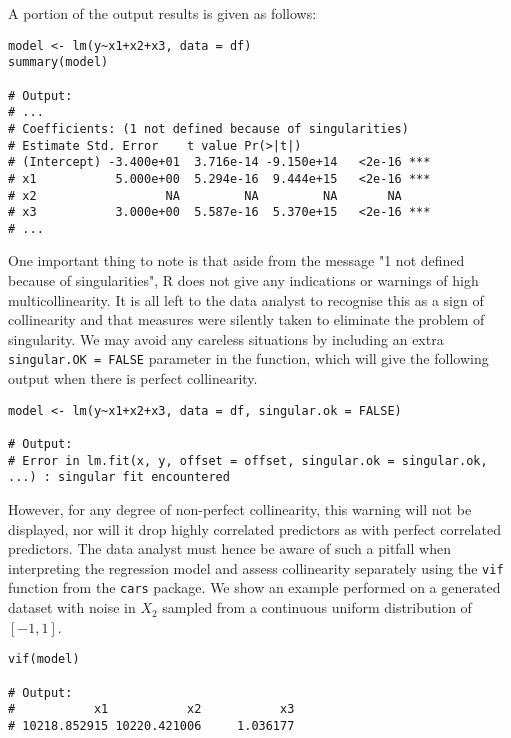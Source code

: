 \documentclass[12pt]{article}
\begin{document}
	A portion of the output results is given as follows:
	\vspace{2mm}
	\begin{lstlisting}
model <- lm(y~x1+x2+x3, data = df)
summary(model)

# Output: 
# ...
# Coefficients: (1 not defined because of singularities)
# Estimate Std. Error    t value Pr(>|t|)    
# (Intercept) -3.400e+01  3.716e-14 -9.150e+14   <2e-16 ***
# x1           5.000e+00  5.294e-16  9.444e+15   <2e-16 ***
# x2                  NA         NA         NA       NA    
# x3           3.000e+00  5.587e-16  5.370e+15   <2e-16 ***
# ...
	\end{lstlisting}
	\vspace{2mm}
	
	One important thing to note is that aside from the message "1 not defined because of singularities", R does not give any indications or warnings of high multicollinearity. It is \pagebreak all left to the data analyst to recognise this as a sign of collinearity and that measures were silently taken to eliminate the problem of singularity. We may avoid any careless situations by including an extra \texttt{singular.OK = FALSE} parameter in the function, which will give the following output when there is perfect collinearity.
	\vspace{2mm}
	\begin{lstlisting}
model <- lm(y~x1+x2+x3, data = df, singular.ok = FALSE)

# Output: 
# Error in lm.fit(x, y, offset = offset, singular.ok = singular.ok, ...) : singular fit encountered
	\end{lstlisting}
	\vspace{2mm}

	However, for any degree of non-perfect collinearity, this warning will not be displayed, nor will it drop highly correlated predictors as with perfect correlated predictors. The data analyst must hence be aware of such a pitfall when interpreting the regression model and assess collinearity separately using the \texttt{vif} function from the \texttt{cars} package. We show an example performed on a generated dataset with noise in $X_2$ sampled from a continuous uniform distribution of $[-1,1]$.\\
	
\begin{lstlisting}
vif(model)

# Output: 
#           x1           x2           x3 
# 10218.852915 10220.421006     1.036177 
\end{lstlisting}
	
\end{document}
